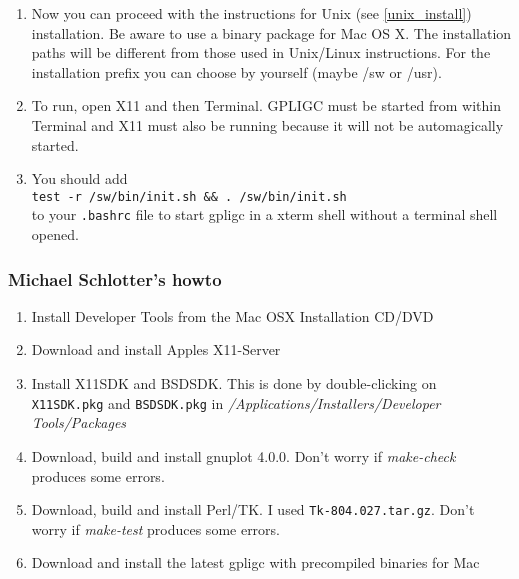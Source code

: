 \begin{enumerate}
\item Now you can proceed with the instructions for Unix (see \ref{unix_install}) installation. Be aware to use a binary package for Mac OS X. 
The installation paths will be different from those used in Unix/Linux instructions.
For the installation prefix  you can choose by yourself (maybe /sw or /usr).

\item  To run, open X11 and then Terminal.  GPLIGC must be started from
within Terminal and X11 must also be running because it will not be
automagically started.

\item You should add \\
\texttt{test -r /sw/bin/init.sh \&\& . /sw/bin/init.sh} \\
to your \texttt{.bashrc} file to start gpligc in a xterm shell
without a terminal shell opened.

\end{enumerate}


\subsubsection{Michael Schlotter's howto}
\label{schlotter}

\begin{enumerate}
\item  Install Developer Tools from the Mac OSX Installation CD/DVD
\item  Download and install Apples X11-Server
\item  Install X11SDK and BSDSDK. This is done by double-clicking on
    \texttt{X11SDK.pkg} and \texttt{BSDSDK.pkg} in
    \textit{/Applications/Installers/Developer Tools/Packages}
\item Download, build and install gnuplot 4.0.0.
    Don't worry if \textit{make-check} produces some errors.
\item Download, build and install Perl/TK. I used \texttt{Tk-804.027.tar.gz}.
    Don't worry if \textit{make-test} produces some errors.
\item Download and install the latest gpligc with precompiled binaries for Mac
\end{enumerate}
